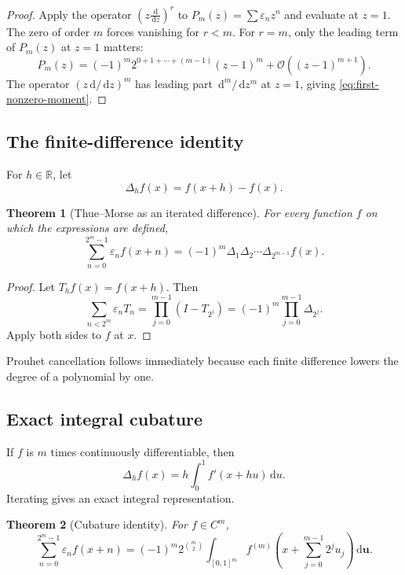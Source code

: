 \documentclass[11pt,oneside]{article}
\newtheorem{theorem}{Theorem}[section]
\theoremstyle{definition}
\theoremstyle{remark}
\newcommand{\R}{\mathbb R}
\newcommand{\dd}{\,\mathrm d}
\newcommand{\bigO}{\mathcal O}
\newcommand{\eps}{\varepsilon}
\begin{document}
\begin{proof}
Apply the operator $(z\frac{\dd}{\dd z})^r$ to
$P_m(z)=\sum\eps_nz^n$ and evaluate at $z=1$.  The zero of order $m$ forces
vanishing for $r<m$.  For $r=m$, only the leading term of
$P_m(z)$ at $z=1$ matters:
\[
 P_m(z)=(-1)^m2^{0+1+\cdots+(m-1)}(z-1)^m+\bigO((z-1)^{m+1}).
\]
The operator $(z\dd/\dd z)^m$ has leading part $\dd^m/\dd z^m$ at $z=1$,
giving \cref{eq:first-nonzero-moment}.
\end{proof}

\subsection{The finite-difference identity}

For $h\in\R$, let
\begin{equation}\label{eq:finite-difference-def}
 \Delta_hf(x)=f(x+h)-f(x).
\end{equation}

\begin{theorem}[Thue--Morse as an iterated difference]\label{thm:finite-difference}
For every function $f$ on which the expressions are defined,
\begin{equation}\label{eq:finite-difference}
 \boxed{\qquad
 \sum_{n=0}^{2^m-1}\eps_nf(x+n)
 =(-1)^m\Delta_1\Delta_2\cdots\Delta_{2^{m-1}}f(x).
 \qquad}
\end{equation}
\end{theorem}

\begin{proof}
Let $T_hf(x)=f(x+h)$.  Then
\[
 \sum_{n<2^m}\eps_nT_n
 =\prod_{j=0}^{m-1}(I-T_{2^j})
 =(-1)^m\prod_{j=0}^{m-1}\Delta_{2^j}.
\]
Apply both sides to $f$ at $x$.
\end{proof}

Prouhet cancellation follows immediately because each finite difference lowers
the degree of a polynomial by one.

\subsection{Exact integral cubature}

If $f$ is $m$ times continuously differentiable, then
\begin{equation}\label{eq:one-difference-integral}
 \Delta_hf(x)=h\int_0^1f'(x+hu)\dd u.
\end{equation}
Iterating gives an exact integral representation.

\begin{theorem}[Cubature identity]\label{thm:cubature}
For $f\in C^m$,
\begin{equation}\label{eq:cubature}
 \boxed{\quad
 \sum_{n=0}^{2^m-1}\eps_nf(x+n)
 =(-1)^m2^{\binom m2}
  \int_{[0,1]^m}
  f^{(m)}\!\left(x+\sum_{j=0}^{m-1}2^ju_j\right)
  \dd\mathbf u.
 \quad}
\end{equation}
\end{theorem}
\end{document}
